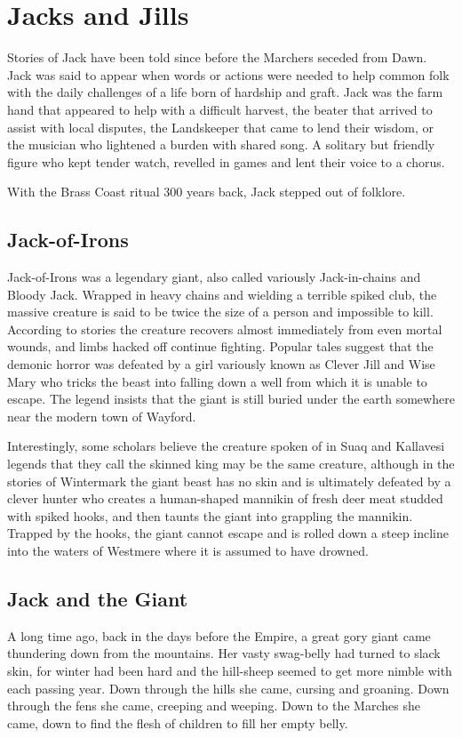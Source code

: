 \section{Jacks and Jills}
Stories of Jack have been told since before the Marchers seceded from Dawn. Jack was said to appear when words or actions were needed to help common folk with the daily challenges of a life born of hardship and graft. Jack was the farm hand that appeared to help with a difficult harvest, the beater that arrived to assist with local disputes, the Landskeeper that came to lend their wisdom, or the musician who lightened a burden with shared song. A solitary but friendly figure who kept tender watch, revelled in games and lent their voice to a chorus.

With the Brass Coast ritual 300 years back, Jack stepped out of folklore.
\subsection{Jack-of-Irons}
Jack-of-Irons was a legendary giant, also called variously Jack-in-chains and Bloody Jack. Wrapped in heavy chains and wielding a terrible spiked club, the massive creature is said to be twice the size of a person and impossible to kill. According to stories the creature recovers almost immediately from even mortal wounds, and limbs hacked off continue fighting. Popular tales suggest that the demonic horror was defeated by a girl variously known as Clever Jill and Wise Mary who tricks the beast into falling down a well from which it is unable to escape. The legend insists that the giant is still buried under the earth somewhere near the modern town of Wayford.

Interestingly, some scholars believe the creature spoken of in Suaq and Kallavesi legends that they call the skinned king may be the same creature, although in the stories of Wintermark the giant beast has no skin and is ultimately defeated by a clever hunter who creates a human-shaped mannikin of fresh deer meat studded with spiked hooks, and then taunts the giant into grappling the mannikin. Trapped by the hooks, the giant cannot escape and is rolled down a steep incline into the waters of Westmere where it is assumed to have drowned. 
\subsection{Jack and the Giant}
A long time ago, back in the days before the Empire, a great gory giant came thundering down from the mountains. Her vasty swag-belly had turned to slack skin, for winter had been hard and the hill-sheep seemed to get more nimble with each passing year. Down through the hills she came, cursing and groaning. Down through the fens she came, creeping and weeping. Down to the Marches she came, down to find the flesh of children to fill her empty belly.

